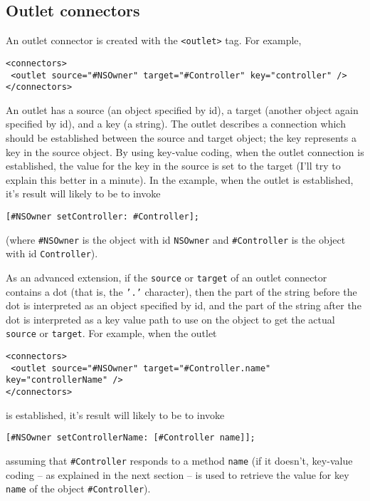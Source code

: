 \subsection{Outlet connectors}
An outlet connector is created with the \texttt{<outlet>} tag.  For
example,
\begin{verbatim}
<connectors>
 <outlet source="#NSOwner" target="#Controller" key="controller" />
</connectors>
\end{verbatim}
An outlet has a source (an object specified by id), a target (another
object again specified by id), and a key (a string).  The outlet
describes a connection which should be established between the source
and target object; the key represents a key in the source object.  By
using key-value coding, when the outlet connection is established, the
value for the key in the source is set to the target (I'll try to
explain this better in a minute).  In the example, when the outlet is
established, it's result will likely to be to invoke
\begin{verbatim}
[#NSOwner setController: #Controller];
\end{verbatim}
(where \texttt{\#NSOwner} is the object with id \texttt{NSOwner} and 
\texttt{\#Controller} is the object with id \texttt{Controller}).

As an advanced extension, if the \texttt{source} or \texttt{target} of
an outlet connector contains a dot (that is, the \texttt{'.'} 
character), then the part of the string before the dot is interpreted
as an object specified by id, and the part of the string after the dot
is interpreted as a key value path to use on the object to get the
actual \texttt{source} or \texttt{target}.  For example, when the outlet
\begin{verbatim}
<connectors>
 <outlet source="#NSOwner" target="#Controller.name" key="controllerName" />
</connectors>
\end{verbatim}
is established, it's result will likely to be to invoke
\begin{verbatim}
[#NSOwner setControllerName: [#Controller name]];
\end{verbatim}
assuming that \texttt{\#Controller} responds to a method
\texttt{name} (if it doesn't, key-value coding -- as explained 
in the next section -- is used to retrieve the value for key
\texttt{name} of the object \texttt{\#Controller}).

